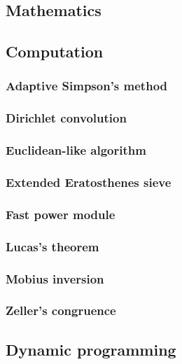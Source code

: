 \documentclass[titlepage,a4paper,10pt]{article}
\begin{document}
\begin{multicols}{2}
\begin{spacing}{0.8}
{		\section{Mathematics}
			\subsection{Computation}
				\subsubsection{Adaptive Simpson's method}
					
				\subsubsection{Dirichlet convolution}
					
				\subsubsection{Euclidean-like algorithm}
					
				\subsubsection{Extended Eratosthenes sieve}
					
				\subsubsection{Fast power module}
					
				\subsubsection{Lucas's theorem}
					
				\subsubsection{Mobius inversion}
					
				\subsubsection{Zeller’s congruence}
					
			\subsection{Dynamic programming}
				
}
\end{spacing}
\end{multicols}
\end{document}
